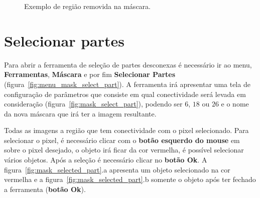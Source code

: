 \begin{figure}[!htb]
  \centering
    \qquad
  \hfill
  \caption{Exemplo de região removida na máscara.}
  \label{fig:mask_removed_part}
\end{figure}

\section{Selecionar partes}

Para abrir a ferramenta de seleção de partes desconexas é necessário ir ao menu, \textbf{Ferramentas}, \textbf{Máscara} e por fim \textbf{Selecionar Partes} (figura~\ref{fig:menu_mask_select_part}). A ferramenta irá apresentar uma tela de configuração de parâmetros que consiste em qual conectividade será levada em consideração (figura~\ref{fig:mask_select_part}), podendo ser $6$, $18$ ou $26$ e o nome da nova máscara que irá ter a imagem resultante.

Todas as imagens a região que tem conectividade com o pixel selecionado. Para selecionar o pixel, é necessário clicar com o \textbf{botão esquerdo do mouse} em sobre o pixel desejado, o objeto irá ficar da cor vermelha, é possível selecionar vários objetos. Após a seleção é necessário clicar no \textbf{botão Ok}. A figura~\ref{fig:mask_selected_part}.a apresenta um objeto selecionado na cor vermelha e a figura~\ref{fig:mask_selected_part}.b  somente o objeto após ter fechado a ferramenta (\textbf{botão Ok}).

